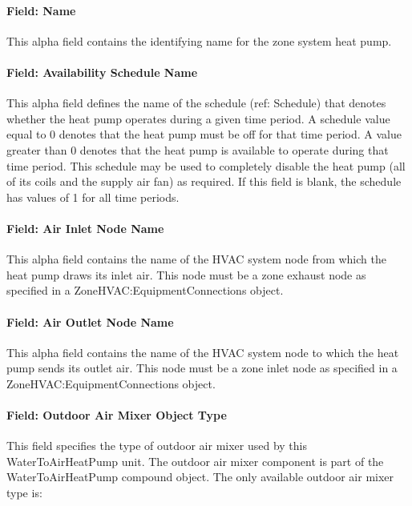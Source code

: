 \paragraph{Field: Name}\label{field-name-11-017}

This alpha field contains the identifying name for the zone system heat pump.

\paragraph{Field: Availability Schedule Name}\label{field-availability-schedule-name-10-001}

This alpha field defines the name of the schedule (ref: Schedule) that denotes whether the heat pump operates during a given time period. A schedule value equal to 0 denotes that the heat pump must be off for that time period. A value greater than 0 denotes that the heat pump is available to operate during that time period. This schedule may be used to completely disable the heat pump (all of its coils and the supply air fan) as required. If this field is blank, the schedule has values of 1 for all time periods.

\paragraph{Field: Air Inlet Node Name}\label{field-air-inlet-node-name-8-000}

This alpha field contains the name of the HVAC system node from which the heat pump draws its inlet air. This node must be a zone exhaust node as specified in a ZoneHVAC:EquipmentConnections object.

\paragraph{Field: Air Outlet Node Name}\label{field-air-outlet-node-name-8-001}

This alpha field contains the name of the HVAC system node to which the heat pump sends its outlet air. This node must be a zone inlet node as specified in a ZoneHVAC:EquipmentConnections object.

\paragraph{Field: Outdoor Air Mixer Object Type}\label{field-outdoor-air-mixer-object-type-4}

This field specifies the type of outdoor air mixer used by this WaterToAirHeatPump unit. The outdoor air mixer component is part of the WaterToAirHeatPump compound object. The only available outdoor air mixer type is:

